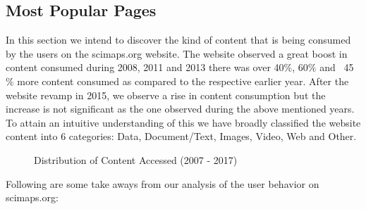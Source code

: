 \subsection{Most Popular Pages} \label{viztoppages}
In this section we intend to discover the kind of content that is being consumed by the users on the scimaps.org website. 
The website observed a great boost in content consumed during 2008, 2011 and 2013 there was over 40$\%$, 60$\%$ and ~45$\%$ more content consumed as compared to the respective earlier year. After the website revamp in 2015, we observe a rise in content consumption but the increase is not significant as the one observed during the above mentioned years. 
To attain an intuitive understanding of this we have broadly classified the website content into 6 categories:
Data, Document/Text, Images, Video, Web and Other.
\begin{figure}
\centering
{}
\caption{Distribution of Content Accessed (2007 - 2017)}
\label{fig:TopURLs}
\end{figure}
Following are some take aways from our analysis of the user behavior on scimaps.org: 
